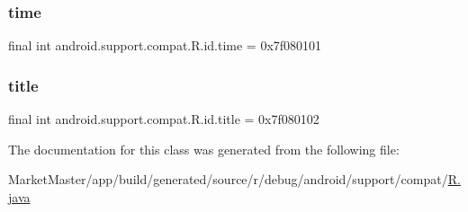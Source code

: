 \subsubsection{\texorpdfstring{time}{time}}
{\footnotesize\ttfamily final int android.\+support.\+compat.\+R.\+id.\+time = 0x7f080101\hspace{0.3cm}{\ttfamily [static]}}

\mbox{\label{classandroid_1_1support_1_1compat_1_1R_1_1id_a40ae774b3537286b4a997e8cbb09e476}} 
\subsubsection{\texorpdfstring{title}{title}}
{\footnotesize\ttfamily final int android.\+support.\+compat.\+R.\+id.\+title = 0x7f080102\hspace{0.3cm}{\ttfamily [static]}}



The documentation for this class was generated from the following file\+:\begin{DoxyCompactItemize}
\item 
Market\+Master/app/build/generated/source/r/debug/android/support/compat/\mbox{\hyperlink{debug_2android_2support_2compat_2R_8java}{R.\+java}}\end{DoxyCompactItemize}
